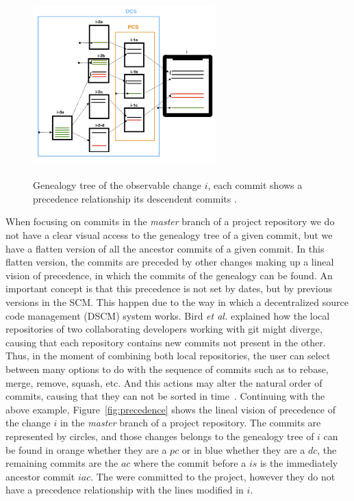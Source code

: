 \documentclass[a4paper, 12pt]{book}
\begin{document}
\begin{figure}[ht]
\centering
\includegraphics[width=200pt,height=200pt]{img/visiontree.png}
\caption{Genealogy tree of the observable change $i$, each commit shows a precedence relationship its descendent commits .}
\label{fig:genealogytree}       %
\end{figure}

When focusing on commits in the \emph{master} branch of a project repository we do not have a clear visual access to the genealogy tree of a given commit, but we have a flatten version of all the ancestor commits of a given commit. In this flatten version, the commits are preceded by other changes making up a lineal vision of precedence, in which the commits of the genealogy can be found. An important concept is that this precedence is not set by dates, but by previous versions in the SCM. This happen due to the way in which a decentralized source code management (DSCM) system works. Bird \emph{et al.} explained how the local repositories of two collaborating developers working with git might diverge, causing that each repository contains new commits not present in the other. Thus, in the moment of combining both local repositories, the user can select between many options to do with the sequence of commits such as to rebase, merge, remove, squash, etc. And this actions may alter the natural order of commits, causing that they can not be sorted in time~\cite{bird2009promises}. Continuing with the above example, Figure~\ref{fig:precedence} shows the lineal vision of precedence of the change $i$ in the \emph{master} branch of a project repository. The commits are represented by circles, and those changes belongs to the genealogy tree of $i$ can be found in orange whether they are a $pc$ or in blue whether they are a $dc$, the remaining commits are the $ac$ where the commit before a $is$ is the immediately ancestor commit $iac$. The  were committed to the project, however they do not have a precedence relationship with the lines modified in $i$.    
\end{document}
